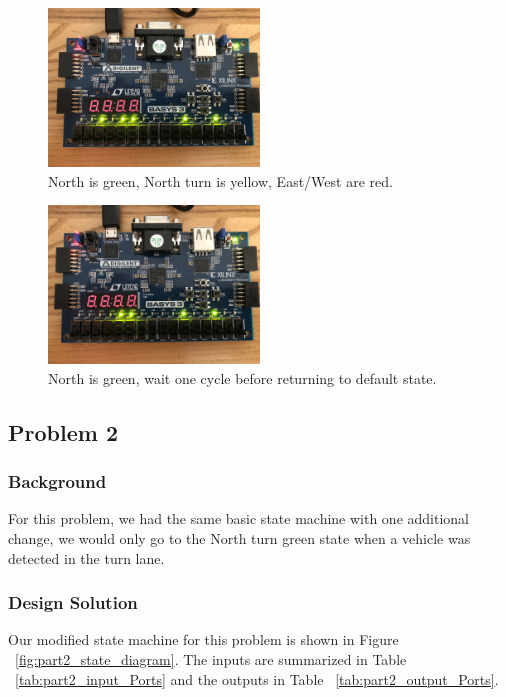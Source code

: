 \documentclass[11pt]{article}
\begin{document}
\begin{figure}[H]
\begin{center}
	\includegraphics[width=0.5\textwidth]{./images/Part1/l9p1img8.jpg}
	\caption{\label{fig:part1_img8}North is green, North turn is yellow, East/West are red.}
\end{center}
\end{figure}

\begin{figure}[H]
\begin{center}
	\includegraphics[width=0.5\textwidth]{./images/Part1/l9p1img9.jpg}
	\caption{\label{fig:part1_img9}North is green, wait one cycle before returning to default state.}
\end{center}
\end{figure}


\subsection{Problem 2 }

\subsubsection{Background}
For this problem, we had the same basic state machine with one additional change, we would only go to the North turn green state when a vehicle was detected in the turn lane.

\subsubsection{Design Solution}
Our modified state machine for this problem is shown in Figure ~\ref{fig:part2_state_diagram}. The inputs are summarized in Table ~\ref{tab:part2_input_Ports} and the outputs in Table ~\ref{tab:part2_output_Ports}.
\end{document}
